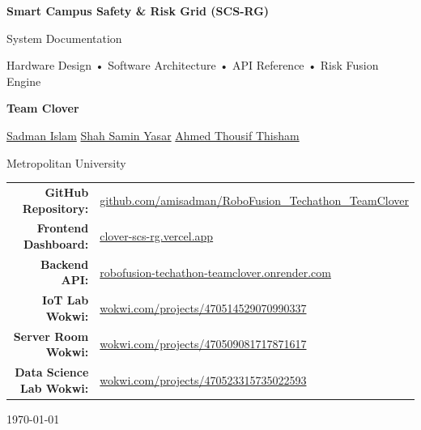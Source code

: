 \documentclass[11pt,a4paper]{article}
\title{}\author{}\date{}
\begin{document}
\begin{titlepage}
\centering
\vspace*{2cm}
{\Huge\bfseries Smart Campus Safety \& Risk Grid (SCS-RG)\par}
\vspace{0.5cm}
{\Large System Documentation\par}
\vspace{0.3cm}
{\large Hardware Design • Software Architecture • API Reference • Risk Fusion Engine\par}
\vfill
{\Large\textbf{Team Clover}\par}
\vspace{0.2cm}
\href{https://github.com/amisadman}{Sadman Islam} \quad \href{https://shahsaminyasar.vercel.app/}{Shah Samin Yasar} \quad \href{https://ahmedthousifportfolio.vercel.app/}{Ahmed Thousif Thisham}

\vspace{0.8cm}
Metropolitan University

\vfill

\begin{center}
\renewcommand{\arraystretch}{1.6}
\begin{tabular}{rl}
\textbf{GitHub Repository:} &
\href{https://github.com/amisadman/RoboFusion_Techathon_TeamClover}{github.com/amisadman/RoboFusion\_Techathon\_TeamClover} \\

\textbf{Frontend Dashboard:} &
\href{https://clover-scs-rg.vercel.app/}{clover-scs-rg.vercel.app} \\

\textbf{Backend API:} &
\href{https://robofusion-techathon-teamclover.onrender.com}{robofusion-techathon-teamclover.onrender.com} \\

\textbf{IoT Lab Wokwi:} &
\href{https://wokwi.com/projects/470514529070990337}{wokwi.com/projects/470514529070990337} \\

\textbf{Server Room Wokwi:} &
\href{https://wokwi.com/projects/470509081717871617}{wokwi.com/projects/470509081717871617} \\

\textbf{Data Science Lab Wokwi:} &
\href{https://wokwi.com/projects/470523315735022593}{wokwi.com/projects/470523315735022593}
\end{tabular}
\end{center}

\vfill
\today
\end{titlepage}
\end{document}
